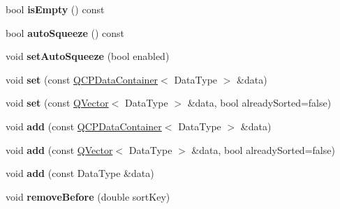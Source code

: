 \begin{DoxyCompactItemize}
\item 
bool {\bfseries is\+Empty} () const \hypertarget{class_q_c_p_data_container_af2a4d189394da4a3e78bf52ff6945f1d}{}\label{class_q_c_p_data_container_af2a4d189394da4a3e78bf52ff6945f1d}

\item 
bool {\bfseries auto\+Squeeze} () const \hypertarget{class_q_c_p_data_container_a998f6e133f162f32818ca529a0be7355}{}\label{class_q_c_p_data_container_a998f6e133f162f32818ca529a0be7355}

\item 
void {\bfseries set\+Auto\+Squeeze} (bool enabled)\hypertarget{class_q_c_p_data_container_a233f866760a78950d2a393c1a4bc54b5}{}\label{class_q_c_p_data_container_a233f866760a78950d2a393c1a4bc54b5}

\item 
void {\bfseries set} (const \hyperlink{class_q_c_p_data_container}{Q\+C\+P\+Data\+Container}$<$ Data\+Type $>$ \&data)\hypertarget{class_q_c_p_data_container_ae7042bd534fc3ce7befa2ce3f790b5bf}{}\label{class_q_c_p_data_container_ae7042bd534fc3ce7befa2ce3f790b5bf}

\item 
void {\bfseries set} (const \hyperlink{class_q_vector}{Q\+Vector}$<$ Data\+Type $>$ \&data, bool already\+Sorted=false)\hypertarget{class_q_c_p_data_container_aff99fffbb26597a354c4bc8312596ab2}{}\label{class_q_c_p_data_container_aff99fffbb26597a354c4bc8312596ab2}

\item 
void {\bfseries add} (const \hyperlink{class_q_c_p_data_container}{Q\+C\+P\+Data\+Container}$<$ Data\+Type $>$ \&data)\hypertarget{class_q_c_p_data_container_a42b98bd994307ccd163a43d576f91ad9}{}\label{class_q_c_p_data_container_a42b98bd994307ccd163a43d576f91ad9}

\item 
void {\bfseries add} (const \hyperlink{class_q_vector}{Q\+Vector}$<$ Data\+Type $>$ \&data, bool already\+Sorted=false)\hypertarget{class_q_c_p_data_container_a51d2a4c9ce4baf5e950b767d26673972}{}\label{class_q_c_p_data_container_a51d2a4c9ce4baf5e950b767d26673972}

\item 
void {\bfseries add} (const Data\+Type \&data)\hypertarget{class_q_c_p_data_container_a715e8e9972466804954a2f8fbd5288b7}{}\label{class_q_c_p_data_container_a715e8e9972466804954a2f8fbd5288b7}

\item 
void {\bfseries remove\+Before} (double sort\+Key)\hypertarget{class_q_c_p_data_container_aa7f74cbce304b0369e1626c3798e1eda}{}\label{class_q_c_p_data_container_aa7f74cbce304b0369e1626c3798e1eda}


\end{DoxyCompactItemize}
